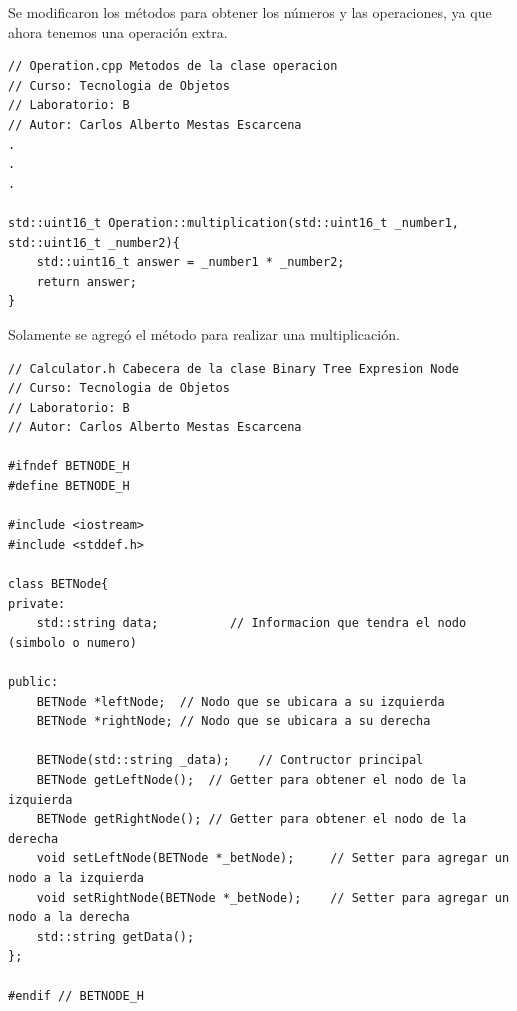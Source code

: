 \documentclass[a4paper,12pt]{article}
\begin{document}
\clearpage
\newpage

Se modificaron los métodos para obtener los números y las operaciones, ya que ahora tenemos una operación extra.


\begin{verbatim} 
// Operation.cpp Metodos de la clase operacion
// Curso: Tecnologia de Objetos
// Laboratorio: B
// Autor: Carlos Alberto Mestas Escarcena
.
.
.

std::uint16_t Operation::multiplication(std::uint16_t _number1, std::uint16_t _number2){
    std::uint16_t answer = _number1 * _number2;
    return answer;
}
\end{verbatim} 

Solamente se agregó el método para realizar una multiplicación.

\begin{verbatim} 
// Calculator.h Cabecera de la clase Binary Tree Expresion Node
// Curso: Tecnologia de Objetos
// Laboratorio: B
// Autor: Carlos Alberto Mestas Escarcena

#ifndef BETNODE_H
#define BETNODE_H

#include <iostream>
#include <stddef.h>

class BETNode{
private:
    std::string data;          // Informacion que tendra el nodo (simbolo o numero)

public:
    BETNode *leftNode;  // Nodo que se ubicara a su izquierda
    BETNode *rightNode; // Nodo que se ubicara a su derecha

    BETNode(std::string _data);    // Contructor principal
    BETNode getLeftNode();  // Getter para obtener el nodo de la izquierda
    BETNode getRightNode(); // Getter para obtener el nodo de la derecha
    void setLeftNode(BETNode *_betNode);     // Setter para agregar un nodo a la izquierda
    void setRightNode(BETNode *_betNode);    // Setter para agregar un nodo a la derecha
    std::string getData();
};

#endif // BETNODE_H
\end{verbatim} 
\end{document}
